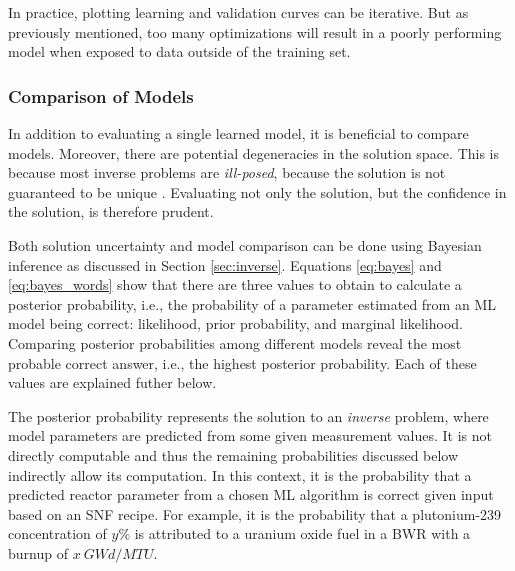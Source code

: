 In practice, plotting learning and validation curves can be iterative. But as
previously mentioned, too many optimizations will result in a poorly performing
model when exposed to data outside of the training set.

\subsubsection{Comparison of Models}
\label{sec:invcompare}

In addition to evaluating a single learned model, it is beneficial to compare
models. Moreover, there are potential degeneracies in the solution space. This
is because most inverse problems are \textit{ill-posed}, because the solution
is not guaranteed to be unique \cite{skutnik_2016}.  Evaluating not only the
solution, but the confidence in the solution, is therefore prudent.

Both solution uncertainty and model comparison can be done using Bayesian
inference as discussed in Section \ref{sec:inverse}.  Equations \ref{eq:bayes}
and \ref{eq:bayes_words} show that there are three values to obtain to
calculate a posterior probability, i.e., the probability of a parameter
estimated from an \gls{ML} model being correct: likelihood, prior
probability, and marginal likelihood.  Comparing posterior probabilities among
different models reveal the most probable correct answer, i.e., the highest
posterior probability.  \cite{inverse_theory, gentle_bayes} Each of these
values are explained futher below.

The posterior probability represents the solution to an \textit{inverse}
problem, where model parameters are predicted from some given measurement
values. It is not directly computable and thus the remaining probabilities
discussed below indirectly allow its computation.  In this context, it is the
probability that a predicted reactor parameter from a chosen \gls{ML}
algorithm is correct given input based on an \gls{SNF} recipe.  For example, it
is the probability that a plutonium-239 concentration of $y\%$ is attributed to
a uranium oxide fuel in a \gls{BWR} with a burnup of $x\ GWd/MTU$.  

